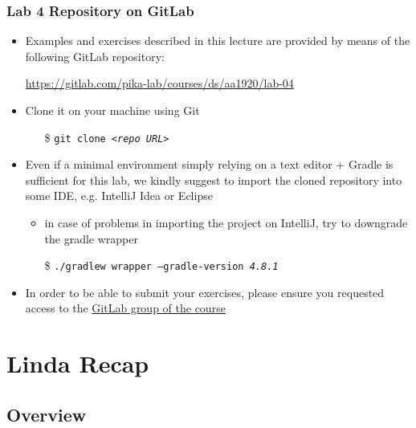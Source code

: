 \documentclass[presentation]{beamer}\mode<presentation>{\usetheme{AMSCesenaPurpleAndGold}}
\begin{document}
\begin{frame}
\frametitle{Lab 4 Repository on GitLab}

	\begin{itemize}
		\item Examples and exercises described in this lecture are provided by means of the following GitLab repository:
		\begin{center}
			\url{https://gitlab.com/pika-lab/courses/ds/aa1920/lab-04}
		\end{center}
		
		\vfill
		
		\item Clone it on your machine using Git
		\begin{itemize}
		    \item[\$] \texttt{git clone \textit{<repo URL>}}
		\end{itemize}
		
		\vfill
		
		\item Even if a minimal environment simply relying on a text editor + Gradle is sufficient for this lab, we kindly suggest to import the cloned repository into some IDE, e.g. IntelliJ Idea or Eclipse
		\begin{itemize}
		    \item in case of problems in importing the project on IntelliJ, try to downgrade the gradle wrapper
		    \item[\$] \texttt{./gradlew wrapper \alert{--gradle-version \textit{4.8.1}}}
		\end{itemize}
		
		\vfill
		
		\item In order to be able to submit your exercises, please ensure you requested access to the \href{https://gitlab.com/pika-lab/courses/ds/aa1920}{GitLab group of the course}
	\end{itemize}

\end{frame}

\section{Linda Recap}

\subsection{Overview} 
\end{document}
